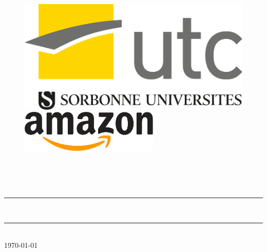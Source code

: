 \thispagestyle{empty} %
\setcounter{page}{0} %

\begin{figure}
        \includegraphics[width=0.4\linewidth]{./Graphismes-UTC/logos/Amazon/3072.pdf}\hfill
        \includegraphics[height = 2cm, keepaspectratio]{./Graphismes-UTC/logos/Amazon/Amazon_logo.pdf}
\end{figure}

\vspace{3cm}

\begin{center}
    \\
    \vspace{0.5cm}
    \\
    \vspace{0.5cm}
    \\
\end{center}


\begin{center}

{\color{jauneUTC}\rule{\linewidth}{0.8mm}}
\vspace*{0mm}
\Huge{\textbf{\theUV \\ \thetitle}}
{\color{jauneUTC}\rule{\linewidth}{0.8mm}}

\vspace{0.5cm}
\Large{\theauthor} \\
\Large{\today}
\end{center}
 
\vspace{2cm}

